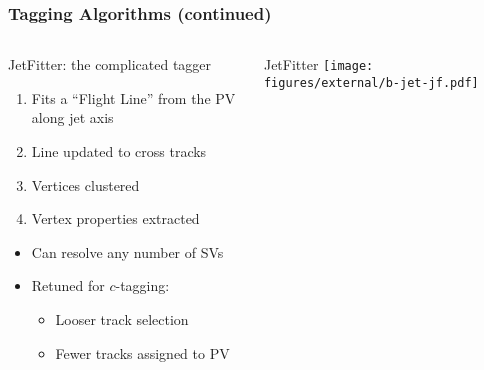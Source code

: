 \documentclass[usenames,dvipsnames]{beamer}
\begin{document}
\begin{frame}
  \frametitle{Tagging Algorithms (continued)}
  \begin{columns}
    \begin{column}{0.5\textwidth}
      JetFitter: the complicated tagger
      \begin{enumerate}
      \item Fits a ``Flight Line'' from the PV along jet axis
      \item Line updated to cross tracks
      \item Vertices clustered
      \item Vertex properties extracted
      \end{enumerate}
      \begin{itemize}
      \item Can resolve any number of SVs
      \item Retuned for $c$-tagging:
        \begin{itemize}
        \item Looser track selection
        \item Fewer tracks assigned to PV
        \end{itemize}
      \end{itemize}
    \end{column}
    \begin{column}{0.5\textwidth}
        \begin{center}
          JetFitter
      \texttt{[image: figures/external/b-jet-jf.pdf]}
        \end{center}
    \end{column}
  \end{columns}
\end{frame}
\end{document}
